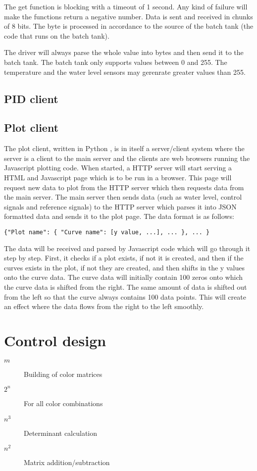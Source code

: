 \documentclass{article}
\begin{document}
The get function is blocking with a timeout of 1 second. Any kind of failure will make the functions return a negative number. Data is sent and received in chunks of 8 bits. The byte is processed in accordance to the source of the batch tank \cite{kokare.c} (the code that runs on the batch tank). 

The driver will always parse the whole value into bytes and then send it to the batch tank. The batch tank only supports values between 0 and 255. The temperature and the water level sensors may gerenrate greater values than 255. 

\subsection{PID client}

\subsection{Plot client}
The plot client, written in Python \cite{python}, is in itself a server/client system where the server is a client to the main server and the clients are web browsers running the Javascript plotting code. When started, a HTTP server will start serving a HTML and Javascript page which is to be run in a browser. This page will request new data to plot from the HTTP server which then requests data from the main server. The main server then sends data (such as water level, control signals and reference signals) to the HTTP server which parses it into JSON \cite{json} formatted data and sends it to the plot page. The data format is as follows:
\begin{verbatim}
{"Plot name": { "Curve name": [y value, ...], ... }, ... }
\end{verbatim}
The data will be received and parsed by Javascript code which will go through it step by step. First, it checks if a plot exists, if not it is created, and then if the curves exists in the plot, if not they are created, and then shifts in the y values onto the curve data. The curve data will initially contain 100 zeros onto which the curve data is shifted from the right. The same amount of data is shifted out from the left so that the curve always contains 100 data points. This will create an effect where the data flows from the right to the left smoothly.

\section{Control design}
\begin{description}
\item[$m$] Building of color matrices
\item[$2^n$] For all color combinations
\item[$n^3$] Determinant calculation
\item[$n^2$] Matrix addition/subtraction
\end{description}
\end{document}
